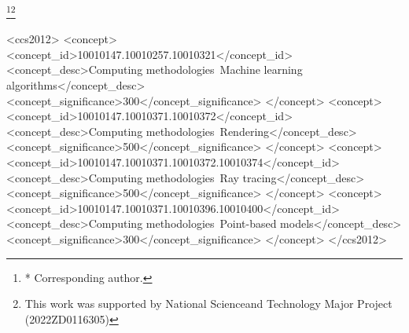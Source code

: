 \documentclass[sigconf]{acmart}
\begin{document}
\author{Lei Ma*}
\thanks{* Corresponding author.
}\thanks{This work was supported by National Scienceand Technology Major Project (2022ZD0116305)
}


  


\begin{CCSXML}
<ccs2012>
   <concept>
       <concept_id>10010147.10010257.10010321</concept_id>
       <concept_desc>Computing methodologies~Machine learning algorithms</concept_desc>
       <concept_significance>300</concept_significance>
       </concept>
   <concept>
       <concept_id>10010147.10010371.10010372</concept_id>
       <concept_desc>Computing methodologies~Rendering</concept_desc>
       <concept_significance>500</concept_significance>
       </concept>
   <concept>
       <concept_id>10010147.10010371.10010372.10010374</concept_id>
       <concept_desc>Computing methodologies~Ray tracing</concept_desc>
       <concept_significance>500</concept_significance>
       </concept>
   <concept>
       <concept_id>10010147.10010371.10010396.10010400</concept_id>
       <concept_desc>Computing methodologies~Point-based models</concept_desc>
       <concept_significance>300</concept_significance>
       </concept>
 </ccs2012>
\end{CCSXML}
\end{document}
